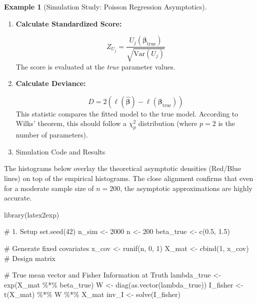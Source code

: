 \documentclass[
  letterpaper,
  DIV=11,
  numbers=noendperiod]{scrreprt}
\newenvironment{Shaded}{\begin{snugshade}}{\end{snugshade}}
\newcommand{\CommentTok}[1]{\textcolor[rgb]{0.37,0.37,0.37}{#1}}
\newcommand{\DecValTok}[1]{\textcolor[rgb]{0.68,0.00,0.00}{#1}}
\newcommand{\FloatTok}[1]{\textcolor[rgb]{0.68,0.00,0.00}{#1}}
\newcommand{\FunctionTok}[1]{\textcolor[rgb]{0.28,0.35,0.67}{#1}}
\newcommand{\NormalTok}[1]{\textcolor[rgb]{0.00,0.23,0.31}{#1}}
\newcommand{\OtherTok}[1]{\textcolor[rgb]{0.00,0.23,0.31}{#1}}
\newcommand{\SpecialCharTok}[1]{\textcolor[rgb]{0.37,0.37,0.37}{#1}}
\renewcommand{\[}{\begin{equation}}
\renewcommand{\]}{\end{equation}}
\theoremstyle{definition}
\theoremstyle{plain}
\theoremstyle{plain}
\theoremstyle{plain}
\theoremstyle{definition}
\newtheorem{example}{Example}[chapter]
\theoremstyle{plain}
\theoremstyle{remark}
\begin{document}
\begin{example}[Simulation Study: Poisson Regression
Asymptotics]
\begin{enumerate}
  \[
  Z_{\hat{\beta}_j} = \frac{\hat{\beta}_j - \beta_{j, \text{true}}}{\text{SE}(\hat{\beta}_j)}
  \] The standard errors are derived from the inverse of the Fisher
  Information matrix,
  \(\mathcal{I}^{-1} = (\mathbf{X}^\top \mathbf{W} \mathbf{X})^{-1}\).
\item
  \textbf{Calculate Standardized Score:}

  \[
  Z_{U_j} = \frac{U_j(\boldsymbol{\beta}_{\text{true}})}{\sqrt{\text{Var}(U_j)}}
  \] The score is evaluated at the \emph{true} parameter values.
\item
  \textbf{Calculate Deviance:}

  \[
  D = 2 \left( \ell(\hat{\boldsymbol{\beta}}) - \ell(\boldsymbol{\beta}_{\text{true}}) \right)
  \] This statistic compares the fitted model to the true model.
  According to Wilks' theorem, this should follow a \(\chi^2_p\)
  distribution (where \(p=2\) is the number of parameters).
\item
  Simulation Code and Results
\end{enumerate}

The histograms below overlay the theoretical asymptotic densities
(Red/Blue lines) on top of the empirical histograms. The close alignment
confirms that even for a moderate sample size of \(n=200\), the
asymptotic approximations are highly accurate.

\begin{Shaded}
\begin{Highlighting}[]
\FunctionTok{library}\NormalTok{(latex2exp)}

\CommentTok{\# 1. Setup}
\FunctionTok{set.seed}\NormalTok{(}\DecValTok{42}\NormalTok{)}
\NormalTok{n\_sim }\OtherTok{\textless{}{-}} \DecValTok{2000}
\NormalTok{n }\OtherTok{\textless{}{-}} \DecValTok{200}
\NormalTok{beta\_true }\OtherTok{\textless{}{-}} \FunctionTok{c}\NormalTok{(}\FloatTok{0.5}\NormalTok{, }\FloatTok{1.5}\NormalTok{)}

\CommentTok{\# Generate fixed covariates}
\NormalTok{x\_cov }\OtherTok{\textless{}{-}} \FunctionTok{runif}\NormalTok{(n, }\DecValTok{0}\NormalTok{, }\DecValTok{1}\NormalTok{)}
\NormalTok{X\_mat }\OtherTok{\textless{}{-}} \FunctionTok{cbind}\NormalTok{(}\DecValTok{1}\NormalTok{, x\_cov) }\CommentTok{\# Design matrix}

\CommentTok{\# True mean vector and Fisher Information at Truth}
\NormalTok{lambda\_true }\OtherTok{\textless{}{-}} \FunctionTok{exp}\NormalTok{(X\_mat }\SpecialCharTok{\%*\%}\NormalTok{ beta\_true)}
\NormalTok{W }\OtherTok{\textless{}{-}} \FunctionTok{diag}\NormalTok{(}\FunctionTok{as.vector}\NormalTok{(lambda\_true))}
\NormalTok{I\_fisher }\OtherTok{\textless{}{-}} \FunctionTok{t}\NormalTok{(X\_mat) }\SpecialCharTok{\%*\%}\NormalTok{ W }\SpecialCharTok{\%*\%}\NormalTok{ X\_mat}
\NormalTok{inv\_I }\OtherTok{\textless{}{-}} \FunctionTok{solve}\NormalTok{(I\_fisher)}


\end{Highlighting}
\end{Shaded}
\end{example}
\end{document}
